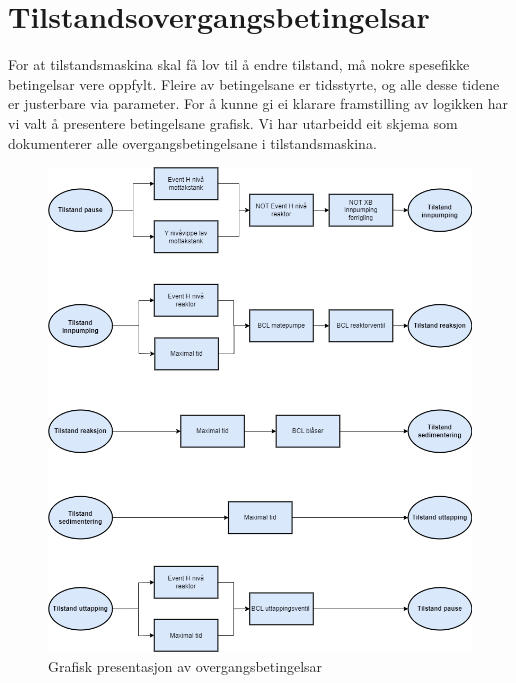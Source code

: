 \section{Tilstandsovergangsbetingelsar}
\thispagestyle{fancy}

For at tilstandsmaskina skal få lov til å endre tilstand, må nokre spesefikke betingelsar vere oppfylt.
Fleire av betingelsane er tidsstyrte, og alle desse tidene er justerbare via parameter.\newline
For å kunne gi ei klarare framstilling av logikken har vi valt å presentere betingelsane grafisk.
Vi har utarbeidd eit skjema som dokumenterer alle overgangsbetingelsane i tilstandsmaskina.\newline \newline

\begin{figure}[htbp]
    \centering
    \includegraphics[scale=0.5]{Figurar/Tilstandsovergang.drawio.png}
    \caption{Grafisk presentasjon av overgangsbetingelsar}\label{fig:Tilstandsovergangsbetingelsar}
\end{figure}

\newpage